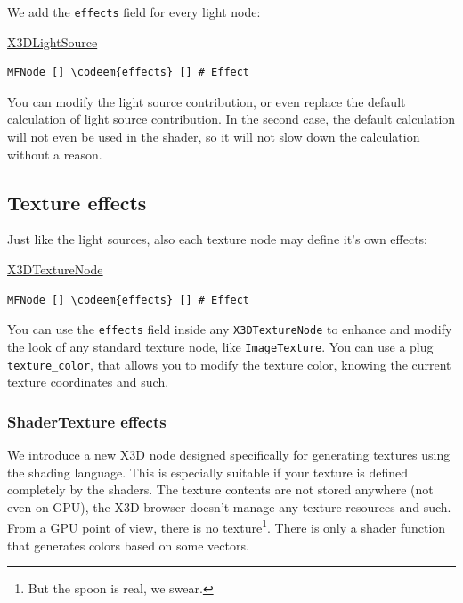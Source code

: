 \documentclass{acmsiggraph}                     %
\newenvironment{mycode}
{\begin{mycodecore}}
{\end{mycodecore}
\vspace{-0.1in}}
\newcommand*{\codeem}[1]{\textbf{#1}}
\begin{document}
We add the \texttt{effects} field for every light node:

\begin{mycode}
\underline{X3DLightSource}
\begin{Verbatim}[commandchars=\\\{\}]
MFNode [] \codeem{effects} [] # Effect
\end{Verbatim}
\end{mycode}


You can modify the light source contribution, or even replace the default
calculation of light source contribution. In the second case,
the default calculation will not even be used in the shader,
so it will not slow down the calculation without a reason.

\subsection{Texture effects}

Just like the light sources, also each texture node may define it's own effects:

\begin{mycode}
\underline{X3DTextureNode}
\begin{Verbatim}[commandchars=\\\{\}]
MFNode [] \codeem{effects} [] # Effect
\end{Verbatim}
\end{mycode}


You can use the \texttt{effects} field
inside any \texttt{X3DTextureNode} to enhance and modify the look of any
standard texture node, like \texttt{ImageTexture}.
You can use a plug \texttt{texture\_color},
that allows you to modify the texture color, knowing the current texture
coordinates and such.

\subsubsection{ShaderTexture effects}

We introduce a new X3D node designed specifically for generating
textures using the shading language. This is especially suitable
if your texture is defined completely by the shaders.
The texture contents are not stored anywhere (not even on GPU),
the X3D browser doesn't manage any texture resources and such.
From a GPU point of view, there is no texture\footnote{But the spoon is real,
we swear.}. There is only a shader function that generates colors
based on some vectors.
\end{document}
